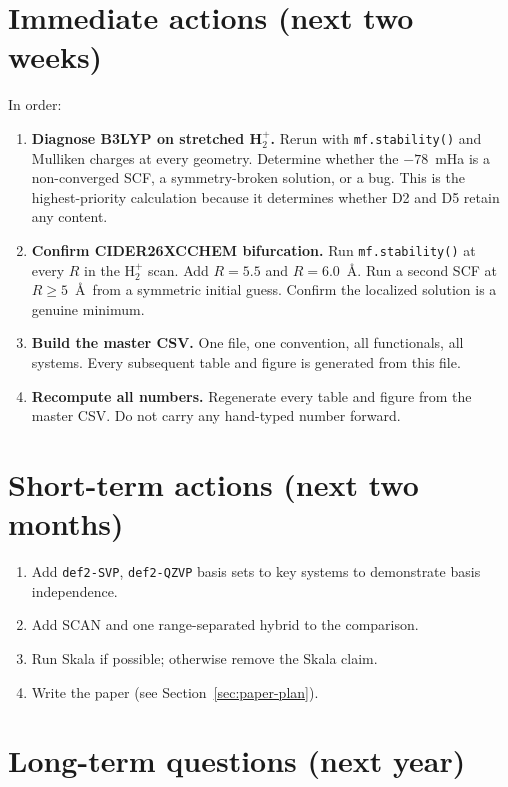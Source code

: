 \documentclass[11pt]{report}
\theoremstyle{definition}
\theoremstyle{remark}
\begin{document}
\section{Immediate actions (next two weeks)}

In order:

\begin{enumerate}
  \item \textbf{Diagnose B3LYP on stretched H$_2^+$.} Rerun with
        \texttt{mf.stability()} and Mulliken charges at every geometry.
        Determine whether the $-78$~mHa is a non-converged SCF, a
        symmetry-broken solution, or a bug. This is the highest-priority
        calculation because it determines whether D2 and D5 retain any
        content.

  \item \textbf{Confirm CIDER26XCCHEM bifurcation.} Run
        \texttt{mf.stability()} at every $R$ in the H$_2^+$ scan. Add
        $R = 5.5$ and $R = 6.0$~\AA. Run a second SCF at $R \ge 5$~\AA\
        from a symmetric initial guess. Confirm the localized solution is
        a genuine minimum.

  \item \textbf{Build the master CSV.} One file, one convention, all
        functionals, all systems. Every subsequent table and figure is
        generated from this file.

  \item \textbf{Recompute all numbers.} Regenerate every table and figure
        from the master CSV. Do not carry any hand-typed number forward.
\end{enumerate}

\section{Short-term actions (next two months)}

\begin{enumerate}
  \item Add \texttt{def2-SVP}, \texttt{def2-QZVP} basis sets to key
        systems to demonstrate basis independence.
  \item Add SCAN and one range-separated hybrid to the comparison.
  \item Run Skala if possible; otherwise remove the Skala claim.
  \item Write the paper (see Section~\ref{sec:paper-plan}).
\end{enumerate}

\section{Long-term questions (next year)}
\end{document}
